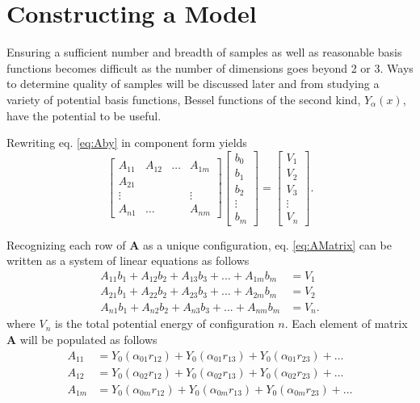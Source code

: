 \section{Constructing a Model}\label{Sect:LJModels}
\par Ensuring a sufficient number and breadth of samples as well as reasonable basis functions becomes difficult as the number of dimensions goes beyond 2 or 3. Ways to determine quality of samples will be discussed later and from studying a variety of potential basis functions, Bessel functions of the second kind, $Y_\alpha(x)$, have the potential to be useful.
\par Rewriting eq. \ref{eq:Aby} in component form yields
\begin{equation}
\begin{bmatrix}
A_{11} & A_{12} & \ldots & A_{1m} \\
A_{21} \\
\vdots & & & \vdots\\
A_{n1} & \ldots & & A_{nm}
\end{bmatrix}
\begin{bmatrix}
b_0 \\
b_1 \\
b_2 \\
\vdots \\
b_m 
\end{bmatrix}
=
\begin{bmatrix}
V_1 \\
V_2 \\
V_3 \\ 
\vdots \\
V_n
\end{bmatrix}.
\label{eq:AMatrix}
\end{equation}
\par Recognizing each row of $\mathbf{A}$ as a unique configuration, eq. \ref{eq:AMatrix} can be written as a system of linear equations as follows
\begin{align}
A_{11}b_1 + A_{12}b_2 + A_{13}b_3 + ... + A_{1m}b_m &= V_1 \nonumber \\
A_{21}b_1 + A_{22}b_2 + A_{23}b_3 + ... + A_{2m}b_m &= V_2 \nonumber \\
A_{n1}b_1 + A_{n2}b_2 + A_{n3}b_3 + ... + A_{nm}b_m &= V_n.
\end{align}
where $V_n$ is the total potential energy of configuration $n$. Each element of matrix $\mathbf{A}$ will be populated as follows
\begin{align}
A_{11} &= Y_0(\alpha_{01} r_{12}) + Y_0(\alpha_{01} r_{13}) + Y_0(\alpha_{01} r_{23}) + \ldots \nonumber \\
A_{12} &= Y_0(\alpha_{02} r_{12}) + Y_0(\alpha_{02} r_{13}) + Y_0(\alpha_{02} r_{23}) + \ldots \nonumber \\
A_{1m} &= Y_0(\alpha_{0m} r_{12}) + Y_0(\alpha_{0m} r_{13}) + Y_0(\alpha_{0m} r_{23}) + \ldots \label{eq:fillBessel}
\end{align}
